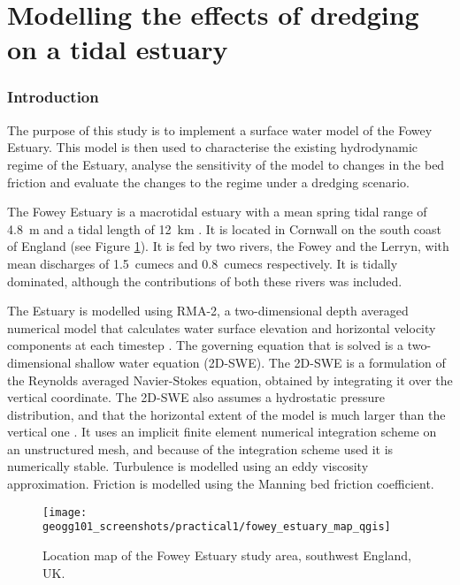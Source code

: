 \documentclass{article}
\begin{document}

\part*{Modelling the effects of dredging on a tidal estuary}

\section{Introduction}

The purpose of this study is to implement a surface water model of the Fowey Estuary. This model is then used to characterise the existing hydrodynamic regime of the Estuary, analyse the sensitivity of the model to changes in the bed friction and evaluate the changes to the regime under a dredging scenario. %

The Fowey Estuary is a macrotidal estuary with a mean spring tidal range of \SI{4.8}{\m} and a tidal length of \SI{12}{km} \parencite{uncles2002dependence}. It is located in Cornwall on the south coast of England (see Figure \ref{fig:fowey_estuary_map}). It is fed by two rivers, the Fowey and the Lerryn, with mean discharges of \SI{1.5}{cumecs} and \SI{0.8}{cumecs} respectively. It is tidally dominated, although the contributions of both these rivers was included.

The Estuary is modelled using RMA-2, a two-dimensional depth averaged numerical model that calculates water surface elevation and horizontal velocity components at each timestep \parencite{king1990program}.
The governing equation that is solved is a two-dimensional shallow water equation (2D-SWE). The 2D-SWE is a formulation of the Reynolds averaged Navier-Stokes equation, obtained by integrating it over the vertical coordinate. The 2D-SWE also assumes a hydrostatic pressure distribution, and that the horizontal extent of the model is much larger than the vertical one \parencite{cea2006numerical}.
It uses an implicit finite element numerical integration scheme on an unstructured mesh, and because of the integration scheme used it is numerically stable. Turbulence is modelled using an eddy viscosity approximation. Friction is modelled using the Manning bed friction coefficient.

\begin{figure}[hbp]
    \centering
    \texttt{[image: geogg101\_screenshots/practical1/fowey\_estuary\_map\_qgis]}
    \caption{Location map of the Fowey Estuary study area, southwest England, UK. }
    \label{fig:fowey_estuary_map}
\end{figure}
\end{document}
